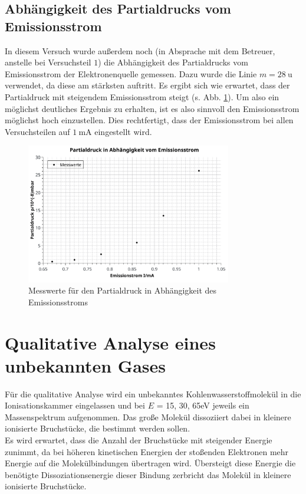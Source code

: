 \subsection{Abhängigkeit des Partialdrucks vom Emissionsstrom}

In diesem Versuch wurde außerdem noch (in Absprache mit dem Betreuer, anstelle bei Versuchsteil $1$) die Abhängigkeit des Partialdrucks vom Emissionsstrom der Elektronenquelle gemessen. Dazu wurde die Linie $m=\SI{28}{\amu}$ verwendet, da diese am stärksten auftritt.
Es ergibt sich wie erwartet, dass der Partialdruck mit steigendem Emissionsstrom steigt (s. Abb. \ref{fig:v43}). Um also ein möglichst deutliches Ergebnis zu erhalten, ist es also sinnvoll den Emissionsstrom möglichst hoch einzustellen. Dies rechtfertigt, dass der Emissionsstrom bei allen Versuchsteilen auf $\SI{1}{\milli\ampere}$ eingestellt wird.

\begin{figure}[tb]
	\centering\includegraphics[width=0.8\textwidth]{fig/a4_emissionsstrom.pdf}
	\caption{Messwerte für den Partialdruck in Abhängigkeit des Emissionsstroms}
	\label{fig:v43}
\end{figure}

\section{Qualitative Analyse eines unbekannten Gases}

Für die qualitative Analyse wird ein unbekanntes Kohlenwasserstoffmolekül in die Ionisationskammer eingelassen und bei $E$ = {15, 30, 65}\;eV jeweils ein Massenspektrum aufgenommen.
Das große Molekül dissoziiert dabei in kleinere ionisierte Bruchstücke, die bestimmt werden sollen.\\
Es wird erwartet, dass die Anzahl der Bruchstücke mit steigender Energie zunimmt, da bei höheren kinetischen Energien der stoßenden Elektronen mehr Energie auf die Molekülbindungen übertragen wird. 
Übersteigt diese Energie die benötigte Dissoziationsenergie dieser Bindung zerbricht das Molekül in kleinere ionisierte Bruchstücke.

